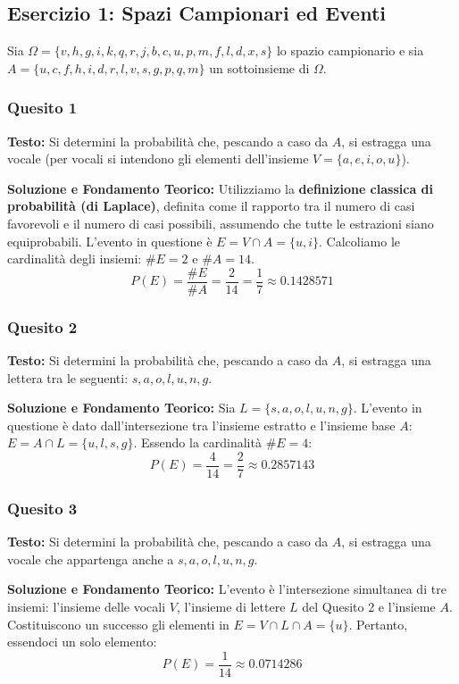 \documentclass[12pt, a4paper]{article}
\begin{document}
\subsection*{Esercizio 1: Spazi Campionari ed Eventi}
Sia $\Omega=\{v,h,g,i,k,q,r,j,b,c,u,p,m,f,l,d,x,s\}$ lo spazio campionario e sia \\ $A=\{u,c,f,h,i,d,r,l,v,s,g,p,q,m\}$ un sottoinsieme di $\Omega$.

\subsubsection*{Quesito 1}
\textbf{Testo:} Si determini la probabilità che, pescando a caso da $A$, si estragga una vocale (per vocali si intendono gli elementi dell'insieme $V=\{a,e,i,o,u\}$).

\textbf{Soluzione e Fondamento Teorico:} 
Utilizziamo la \textbf{definizione classica di probabilità (di Laplace)}, definita come il rapporto tra il numero di casi favorevoli e il numero di casi possibili, assumendo che tutte le estrazioni siano equiprobabili. 
L'evento in questione è $E = V \cap A = \{u, i\}$. 
Calcoliamo le cardinalità degli insiemi: $\#E = 2$ e $\#A = 14$.
$$ P(E) = \frac{\#E}{\#A} = \frac{2}{14} = \frac{1}{7} \approx 0.1428571 $$

\subsubsection*{Quesito 2}
\textbf{Testo:} Si determini la probabilità che, pescando a caso da $A$, si estragga una lettera tra le seguenti: $s, a, o, l, u, n, g$.

\textbf{Soluzione e Fondamento Teorico:} 
Sia $L = \{s,a,o,l,u,n,g\}$. L'evento in questione è dato dall'intersezione tra l'insieme estratto e l'insieme base $A$: $E = A \cap L = \{u,l,s,g\}$.
Essendo la cardinalità $\#E = 4$:
$$ P(E) = \frac{4}{14} = \frac{2}{7} \approx 0.2857143 $$

\subsubsection*{Quesito 3}
\textbf{Testo:} Si determini la probabilità che, pescando a caso da $A$, si estragga una vocale che appartenga anche a $s, a, o, l, u, n, g$.

\textbf{Soluzione e Fondamento Teorico:} 
L'evento è l'intersezione simultanea di tre insiemi: l'insieme delle vocali $V$, l'insieme di lettere $L$ del Quesito 2 e l'insieme $A$. Costituiscono un successo gli elementi in $E = V \cap L \cap A = \{u\}$. Pertanto, essendoci un solo elemento:
$$ P(E) = \frac{1}{14} \approx 0.0714286 $$
\end{document}
